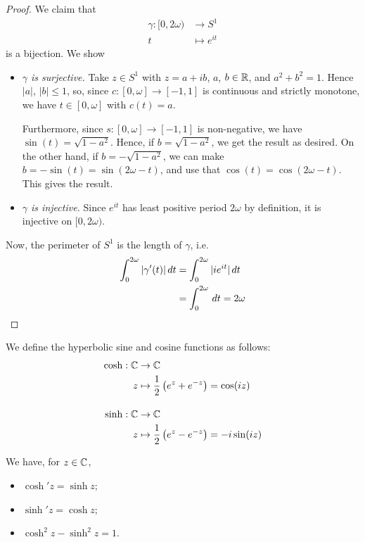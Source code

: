 \documentclass{../template/note}
\begin{document}
    \begin{proof}
        We claim that
        \begin{align*}
            \gamma: [0, 2\omega) &\to S^1 \\
            t &\mapsto e^{it}
        \end{align*}
        is a bijection. We show
        \begin{itemize}
            \item \emph{\(\gamma\) is surjective.} Take \(z \in S^1\) with \(z=a+ib\), \(a\), \(b \in \mathbb R\), and \(a^2+b^2=1\). Hence \(|a|\), \(|b| \leq 1\), so, since \(c: [0, \omega] \to [-1, 1]\) is continuous and strictly monotone, we have \(t \in [0, \omega]\) with \(c(t) = a\).
            
            Furthermore, since \(s: [0, \omega] \to [-1, 1]\) is non-negative, we have \(\sin(t) = \sqrt{1-a^2}\). Hence, if \(b=\sqrt{1-a^2}\), we get the result as desired. On the other hand, if \(b=-\sqrt{1-a^2}\), we can make \(b=-\sin(t)=\sin(2\omega-t)\), and use that \(\cos(t)=\cos(2\omega-t)\). This gives the result.

            \item \emph{\(\gamma\) is injective.} Since \(e^{it}\) has least positive period \(2\omega\) by definition, it is injective on \([0, 2\omega)\).
        \end{itemize}

        Now, the perimeter of \(S^1\) is the length of \(\gamma\), i.e.
        \begin{align*}
            \int_0^{2\omega} |\gamma'(t)| \,d{t} &= \int_0^{2\omega} |ie^{it}| \,d{t} \\
            &= \int_0^{2\omega} \,d{t} = 2\omega
        \end{align*}
    \end{proof}
    
    \begin{definition}
        We define the hyperbolic sine and cosine functions as follows:
        \begin{align*}
            \cosh: \mathbb C &\to \mathbb C \\
            z &\mapsto \frac 1 2 \left(e^z+e^{-z}\right) = \cos(iz) \\[10pt]
            \sinh: \mathbb C &\to \mathbb C \\
            z &\mapsto \frac 1 2 \left(e^z-e^{-z}\right) = -i\sin(iz)
        \end{align*}
    \end{definition}
    
    \begin{lemma}
        We have, for \(z \in \mathbb C\),
        \begin{itemize}
            \item \(\cosh'z=\sinh z\);
            \item \(\sinh'z=\cosh z\);
            \item \(\cosh^2z-\sinh^2z=1\).
        \end{itemize}
    \end{lemma}
    
    
    
    
    
    
    
    
    
\end{document}

